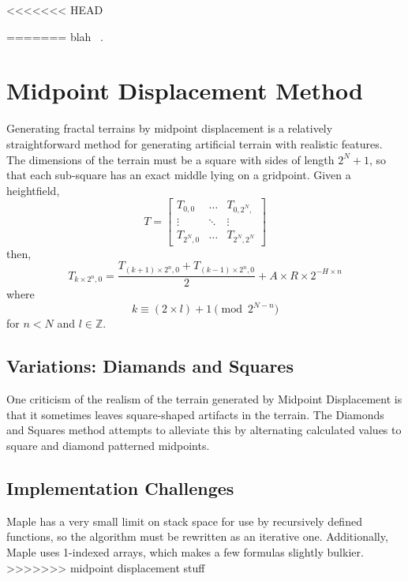 \documentclass{article}
\begin{document}
<<<<<<< HEAD

     

=======
    blah ~\cite{Jo09, PaperII}.
	\section{Midpoint Displacement Method}
		Generating fractal terrains by midpoint displacement is a relatively straightforward method for generating artificial terrain with realistic features. The dimensions of the terrain must be a square with sides of length $2^{N}+1$, so that each sub-square has an exact middle lying on a gridpoint. Given a heightfield,
		\begin{equation}
		T = \left[ \begin{matrix}
		T_{0,0} & \ldots & T_{0,2^{N},} \\
		\vdots  &  \ddots & \vdots \\
		T_{2^{N},0} & \ldots & T_{2^{N},2^{N}}
		\end{matrix} \right]
		\end{equation}
then,
		\begin{equation}
			T_{k \times 2^{n},0} = \frac{T_{(k+1) \times 2^{n},0} + T_{(k-1) \times 2^{n},0}}{2} + A \times R \times 2^{-H \times n}
		\end{equation}
where
		\begin{equation}
			k \equiv (2 \times l)+1 \pmod{2^{N-n}}
		\end{equation}
for $n < N$ and $l \in \mathbb{Z}$.
	\subsection{Variations: Diamands and Squares}
		One criticism of the realism of the terrain generated by Midpoint Displacement is that it sometimes leaves square-shaped artifacts in the terrain. The Diamonds and Squares method attempts to alleviate this by alternating calculated values to square and diamond patterned midpoints. 
	\subsection{Implementation Challenges}
		Maple has a very small limit on stack space for use by recursively defined functions, so the algorithm must be rewritten as an iterative one.
		Additionally, Maple uses 1-indexed arrays, which makes a few formulas slightly bulkier.
>>>>>>> midpoint displacement stuff
     
    
    

     

    
\end{document}
